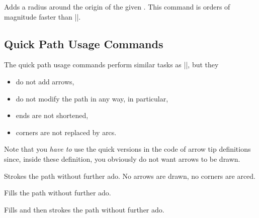 \begin{command}{\pgfpathqcircle{}}
    Adds a radius around the origin of the given . This command is
    orders of magnitude faster than ||.
\begin{codeexample}[]
\end{codeexample}
\end{command}


\subsection{Quick Path Usage Commands}

The quick path usage commands perform similar tasks as |\pgfusepath|, but they
%
\begin{itemize}
    \item do not add arrows,
    \item do not modify the path in any way, in particular,
    \item ends are not shortened,
    \item corners are not replaced by arcs.
\end{itemize}

Note that you \emph{have to} use the quick versions in the code of arrow tip
definitions since, inside these definition, you obviously do not want arrows to
be drawn.

\begin{command}{\pgfusepathqstroke}
    Strokes the path without further ado. No arrows are drawn, no corners are
    arced.
\begin{codeexample}[]
\begin{pgfpicture}
  \pgfpathqcircle{5pt}
  \pgfusepathqstroke
\end{pgfpicture}
\end{codeexample}
\end{command}

\begin{command}{\pgfusepathqfill}
    Fills the path without further ado.
\end{command}

\begin{command}{\pgfusepathqfillstroke}
    Fills and then strokes the path without further ado.
\end{command}


